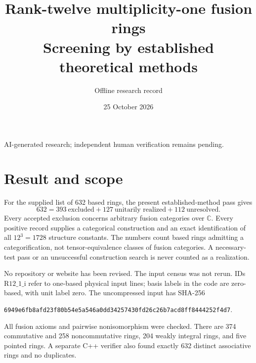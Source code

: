 \documentclass[11pt]{article}
\title{Rank-twelve multiplicity-one fusion rings\\\large Screening by established theoretical methods}
\author{Offline research record}\date{25 October 2026}
\begin{document}
\maketitle
\begin{center}\small AI-generated research; independent human verification remains pending.\end{center}
\section{Result and scope}
For the supplied list of 632 based rings, the present established-method pass gives
\[
\boxed{632=393\ \text{excluded}+127\ \text{unitarily realized}+112\ \text{unresolved}.}
\]
Every accepted exclusion concerns arbitrary fusion categories over $\mathbb C$.
Every positive record supplies a categorical construction and an exact identification of
all $12^3=1728$ structure constants. The numbers count based rings admitting a
categorification, not tensor-equivalence classes of fusion categories. A necessary-test
pass or an unsuccessful construction search is never counted as a realization.

No repository or website has been revised. The input census was not rerun. IDs
$\mathrm{R12\_1\_i}$ refer to one-based physical input lines; basis labels in the code
are zero-based, with unit label zero. The uncompressed input has SHA-256
\begin{center}\scriptsize\texttt{6949e6fb8afd23f80b54e5a546a0dd34257430fd26c26b7acd8ff8444252f4d7}.\end{center}
All fusion axioms and pairwise nonisomorphism were checked. There are 374 commutative
and 258 noncommutative rings, 204 weakly integral rings, and five pointed rings.
A separate C++ verifier also found exactly 632 distinct associative rings and no duplicates.
\end{document}
